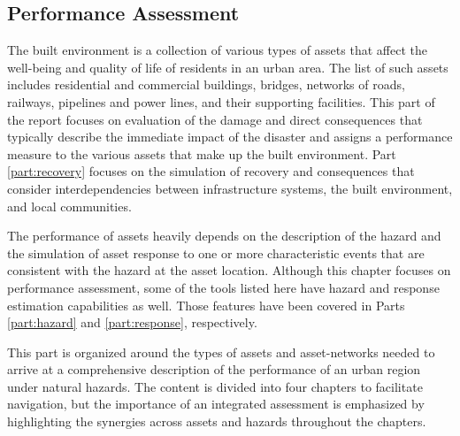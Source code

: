
\begin{partbacktext}
\part{Performance Assessment}\label{part:Performance}

The built environment is a collection of various types of assets that affect the well-being and quality of life of residents in an urban area. The list of such assets includes residential and commercial buildings, bridges, networks of roads, railways, pipelines and power lines, and their supporting facilities. This part of the report focuses on evaluation of the damage and direct consequences that typically describe the immediate impact of the disaster and assigns a performance measure to the various assets that make up the built environment. Part \ref{part:recovery} focuses on the simulation of recovery and consequences that consider interdependencies between infrastructure systems, the built environment, and local communities.

The performance of assets heavily depends on the description of the hazard and the simulation of asset response to one or more characteristic events that are consistent with the hazard at the asset location. Although this chapter focuses on performance assessment, some of the tools listed here have hazard and response estimation capabilities as well. Those features have been covered in Parts \ref{part:hazard} and \ref{part:response}, respectively. 

This part is organized around the types of assets and asset-networks needed to arrive at a comprehensive description of the performance of an urban region under natural hazards. The content is divided into four chapters to facilitate navigation, but the importance of an integrated assessment is emphasized by highlighting the synergies across assets and hazards throughout the chapters.

\end{partbacktext}
